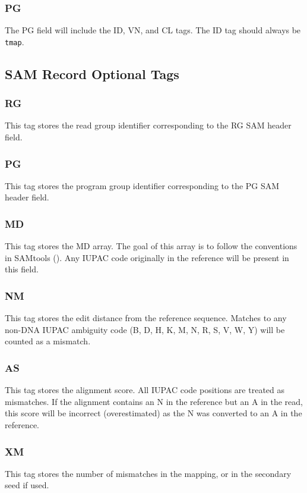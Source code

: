 \documentclass[a4paper,12pt]{book}
\newcommand{\TT}[1]{{\tt #1}} %
\begin{document}
\subsubsection{PG}
The PG field will include the ID, VN, and CL tags.
The ID tag should always be \TT{tmap}.

\subsection{SAM Record Optional Tags}

\subsubsection{RG}
This tag stores the read group identifier corresponding to the RG SAM header field.

\subsubsection{PG}
This tag stores the program group identifier corresponding to the PG SAM header field.

\subsubsection{MD}
This tag stores the MD array.
The goal of this array is to follow the conventions in SAMtools (\cite{SAM-format}).
Any IUPAC code originally in the reference will be present in this field.

\subsubsection{NM}
This tag stores the edit distance from the reference sequence.
Matches to any non-DNA IUPAC ambiguity code (B, D, H, K, M, N, R, S, V, W, Y) will be counted as a mismatch.

\subsubsection{AS}
This tag stores the alignment score.
All IUPAC code positions are treated as mismatches.
If the alignment contains an N in the reference but an A in the read, this score will be incorrect (overestimated) as the N was converted to an A in the reference.

\subsubsection{XM}
This tag stores the number of mismatches in the mapping, or in the secondary seed if used.
\end{document}
